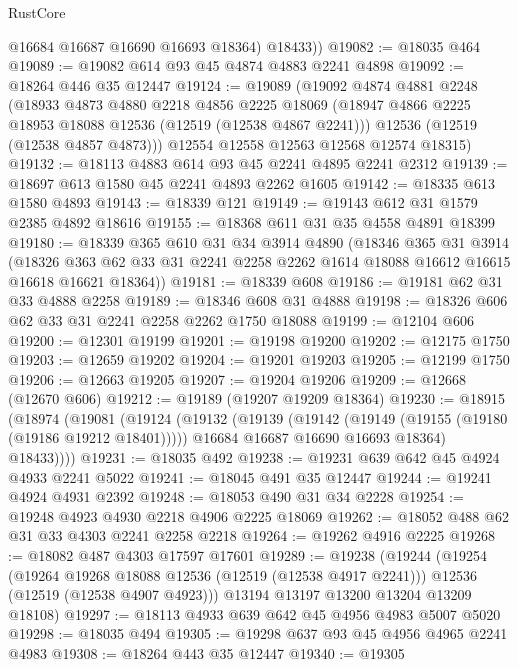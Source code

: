 \begin{lexlean}{RustCore}
\begin{coremodule}
          @16684
          @16687
          @16690
          @16693
          @18364)
        @18433))
@19082 := @18035 @464
@19089 := @19082 @614 @93 @45 @4874 @4883 @2241 @4898
@19092 := @18264 @446 @35 @12447
@19124 := @19089
    (@19092
      @4874
      @4881
      @2248
      (@18933
        @4873
        @4880
        @2218
        @4856
        @2225
        @18069
        (@18947 @4866 @2225 @18953 @18088 @12536 (@12519 (@12538 @4867 @2241)))
        @12536
        (@12519 (@12538 @4857 @4873)))
      @12554
      @12558
      @12563
      @12568
      @12574
      @18315)
@19132 := @18113 @4883 @614 @93 @45 @2241 @4895 @2241 @2312
@19139 := @18697 @613 @1580 @45 @2241 @4893 @2262 @1605
@19142 := @18335 @613 @1580 @4893
@19143 := @18339 @121
@19149 := @19143 @612 @31 @1579 @2385 @4892 @18616
@19155 := @18368 @611 @31 @35 @4558 @4891 @18399
@19180 := @18339
    @365
    @610
    @31
    @34
    @3914
    @4890
    (@18346
      @365
      @31
      @3914
      (@18326 @363 @62 @33 @31 @2241 @2258 @2262 @1614 @18088 @16612 @16615 @16618 @16621 @18364))
@19181 := @18339 @608
@19186 := @19181 @62 @31 @33 @4888 @2258
@19189 := @18346 @608 @31 @4888
@19198 := @18326 @606 @62 @33 @31 @2241 @2258 @2262 @1750 @18088
@19199 := @12104 @606
@19200 := @12301 @19199
@19201 := @19198 @19200
@19202 := @12175 @1750
@19203 := @12659 @19202
@19204 := @19201 @19203
@19205 := @12199 @1750
@19206 := @12663 @19205
@19207 := @19204 @19206
@19209 := @12668 (@12670 @606)
@19212 := @19189 (@19207 @19209 @18364)
@19230 := @18915
    (@18974
      (@19081
        (@19124
          (@19132
            (@19139
              (@19142 (@19149 (@19155 (@19180 (@19186 @19212 @18401)))))
              @16684
              @16687
              @16690
              @16693
              @18364)
            @18433))))
@19231 := @18035 @492
@19238 := @19231 @639 @642 @45 @4924 @4933 @2241 @5022
@19241 := @18045 @491 @35 @12447
@19244 := @19241 @4924 @4931 @2392
@19248 := @18053 @490 @31 @34 @2228
@19254 := @19248 @4923 @4930 @2218 @4906 @2225 @18069
@19262 := @18052 @488 @62 @31 @33 @4303 @2241 @2258 @2218
@19264 := @19262 @4916 @2225
@19268 := @18082 @487 @4303 @17597 @17601
@19289 := @19238
    (@19244
      (@19254
        (@19264 @19268 @18088 @12536 (@12519 (@12538 @4917 @2241)))
        @12536
        (@12519 (@12538 @4907 @4923)))
      @13194
      @13197
      @13200
      @13204
      @13209
      @18108)
@19297 := @18113 @4933 @639 @642 @45 @4956 @4983 @5007 @5020
@19298 := @18035 @494
@19305 := @19298 @637 @93 @45 @4956 @4965 @2241 @4983
@19308 := @18264 @443 @35 @12447
@19340 := @19305

\end{coremodule}
\end{lexlean}
